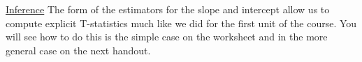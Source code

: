 \documentclass{tufte-handout}
\begin{document}
\vspace*{12pt}

\noindent
\underline{Inference}
The form of the estimators for the slope and intercept allow us to
compute explicit T-statistics much like we did for the first unit of
the course. You will see how to do this is the simple case on the 
worksheet and in the more general case on the next handout.
\end{document}
